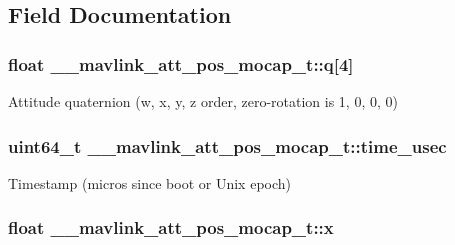 \subsection{Field Documentation}
\hypertarget{struct____mavlink__att__pos__mocap__t_a5982f9253ea45bf83430ba79deeb4c45}{
\subsubsection[{q}]{\setlength{\rightskip}{0pt plus 5cm}float \+\_\+\+\_\+mavlink\+\_\+att\+\_\+pos\+\_\+mocap\+\_\+t\+::q\mbox{[}4\mbox{]}}}\label{struct____mavlink__att__pos__mocap__t_a5982f9253ea45bf83430ba79deeb4c45}


Attitude quaternion (w, x, y, z order, zero-\/rotation is 1, 0, 0, 0) 

\hypertarget{struct____mavlink__att__pos__mocap__t_a0cd64db5a68694d4a7335cf20e4a7246}{
\subsubsection[{time\+\_\+usec}]{\setlength{\rightskip}{0pt plus 5cm}uint64\+\_\+t \+\_\+\+\_\+mavlink\+\_\+att\+\_\+pos\+\_\+mocap\+\_\+t\+::time\+\_\+usec}}\label{struct____mavlink__att__pos__mocap__t_a0cd64db5a68694d4a7335cf20e4a7246}


Timestamp (micros since boot or Unix epoch) 

\hypertarget{struct____mavlink__att__pos__mocap__t_a027bbd8bd036dc4f93f3d04473cec7a3}{
\subsubsection[{x}]{\setlength{\rightskip}{0pt plus 5cm}float \+\_\+\+\_\+mavlink\+\_\+att\+\_\+pos\+\_\+mocap\+\_\+t\+::x}}\label{struct____mavlink__att__pos__mocap__t_a027bbd8bd036dc4f93f3d04473cec7a3}


